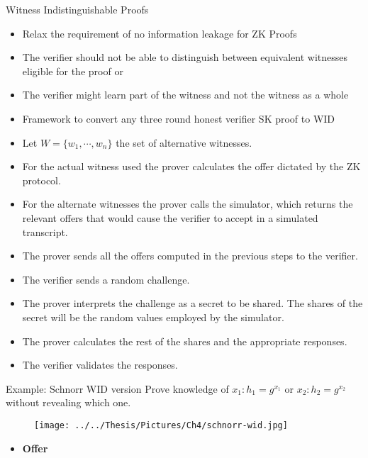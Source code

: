 \documentclass{beamer}
\begin{document}
\begin{frame}[allowframebreaks]{Witness Indistinguishable Proofs}
\begin{itemize}
\item Relax the requirement of no information leakage for ZK Proofs
\item The verifier should not be able to distinguish between equivalent witnesses eligible for the proof or
\item The verifier might learn part of the witness and not the witness as a whole
\item Framework to convert any three round honest verifier SK proof to WID

\framebreak
	 
\item Let $W=\{ w_1, \cdots, w_n \}$ the set of alternative witnesses.
\item For the actual witness used the prover calculates the offer dictated by the ZK protocol.
\item For the alternate witnesses the prover calls the simulator, which returns the relevant offers that would cause the verifier to accept in a simulated transcript.
\item The prover sends all the offers computed in the previous steps to the verifier.
\item The verifier sends a random challenge.
\item The prover interprets the challenge as a secret to be shared. The shares of the secret will be the random values employed by the simulator.
\item The prover calculates the rest of the shares and the appropriate responses.
\item The verifier validates the responses.
\end{itemize}
\framebreak

\begin{block}{Example: Schnorr WID version}
Prove knowledge of $x_1: h_1 = g^{x_1}$ or $x_2:h_2 = g^{x_2}$ without revealing which one.
\end{block}

\begin{figure}[htbp]
\centering
\texttt{[image: ../../Thesis/Pictures/Ch4/schnorr-wid.jpg]} 
\label{fig:cpwid1}
\end{figure}

\framebreak
\tiny
\begin{itemize}
\item \textbf{Offer}


\end{itemize}
\end{frame}
\end{document}

